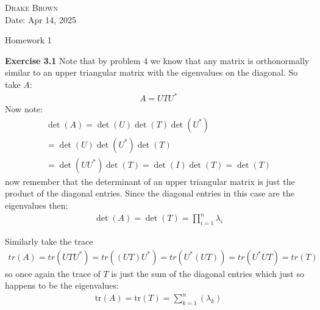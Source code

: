 \documentclass[12pt]{article}
\newenvironment{exercise}[1]{\vspace{.1in}\noindent\textbf{Exercise #1 \hspace{.05em}}}{}
\newcommand{\tr}{\text{tr}}
\theoremstyle{definition}
\theoremstyle{remark}
\begin{document}
\begin{flushright}
	\textsc{Drake Brown}  \\
	Date: Apr 14, 2025
\end{flushright}
\begin{center}
	Homework 1
\end{center}

\begin{exercise}{3.1}
	Note that by problem 4 we know that any matrix is orthonormally similar to an upper triangular matrix with the eigenvalues on the diagonal. So take $A$:
	\begin{align}
		A=UTU^*
	\end{align}
	Now note:
	\begin{align}
		\det(A)=\det(U)\det(T)\det(U^*) \\
		=\det(U)\det(U^*)\det(T)        \\
		=\det(UU^*)\det(T)=\det(I)\det(T)=\det(T)
	\end{align}
	now remember that the determinant of an upper triangular matrix is just the product of the diagonal entries. Since the diagonal entries in this case are the eigenvalues then:
	\begin{align}
		\det(A)=\det(T)=\prod_{i=1}^n\lambda_i
	\end{align}

	Similarly take the trace
	\begin{align}
		tr(A)=tr(UTU^*)=tr((UT)U^*)=tr(U^*(UT))=tr(U^*UT)=tr(T)
	\end{align}
	so once again the trace of $T$ is just the sum of the diagonal entries which just so happens to be the eigenvalues:
	\begin{align}
		\tr(A)=\tr(T)=\sum\limits_{k=1}^{n}(\lambda_k)
	\end{align}
\end{exercise}
\end{document}
